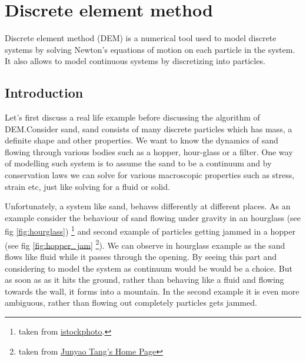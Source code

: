 \chapter{Discrete element method}

Discrete element method (DEM) is a numerical tool used to model discrete systems by
solving Newton's equations of motion on each particle in the system. It also
allows to model continuous systems by discretizing into particles.


\section{Introduction}
\label{sec:introduction}

Let's first discuss a real life example before discussing the algorithm of
DEM.\@ Consider sand, sand consists of many discrete particles which has mass, a
definite shape and other properties. We want to know the dynamics of sand
flowing through various bodies such as a hopper, hour-glass or a filter. One way
of modelling such system is to assume the sand to be a continuum and by
conservation laws we can solve for various macroscopic properties such as
stress, strain etc, just like solving for a fluid or solid.

Unfortunately, a system like sand, behaves differently at different places. As
an example consider the behaviour of sand flowing under gravity in an hourglass
(see fig \ref{fig:hourglass}) \footnote{taken from
  \href{https://www.istockphoto.com/in/videos/hourglass?sort=mostpopular&offlinecontent=include&phrase=hourglass}
  {istockphoto}.}  and second example of particles getting jammed in a hopper
(see fig \ref{fig:hopper_jam} \footnote{taken from
  \href{http://webhome.phy.duke.edu/~jt41/research.html}{Junyao Tang's Home
    Page}}). We can observe in hourglass example as the sand flows like fluid
while it passes through the opening. By seeing this part and considering to
model the system as continuum would be would be a choice. But as soon as as it
hits the ground, rather than behaving like a fluid and flowing towards the wall,
it forms into a mountain. In the second example it is even more ambiguous,
rather than flowing out completely particles gets jammed.


